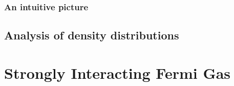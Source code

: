 \documentclass{book}
\theoremstyle{definition}
\begin{document}
\subsection{An intuitive picture}




\section{Analysis of density distributions}













\chapter{Strongly Interacting Fermi Gas}


 




	
	
\end{document}
